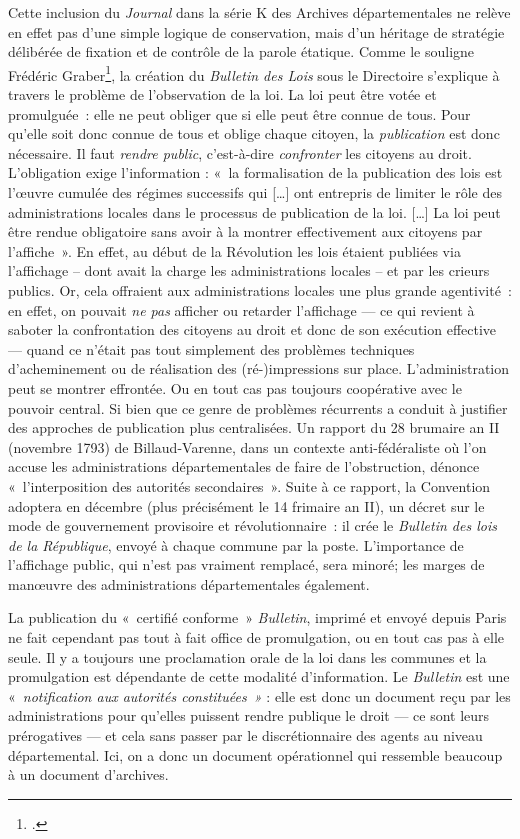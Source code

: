 Cette inclusion du \emph{Journal} dans la série K des Archives départementales ne relève en effet pas d’une simple logique de conservation, mais d’un héritage de stratégie délibérée de fixation et de contrôle de la parole étatique. Comme le souligne Frédéric Graber\footcite[][]{graber}, la création du \emph{Bulletin des Lois} sous le Directoire s'explique à travers le problème de l'observation de la loi. La loi peut être votée et promulguée : elle ne peut obliger que si elle peut être connue de tous. Pour qu’elle soit donc connue de tous et oblige chaque citoyen, la \emph{publication} est donc nécessaire. Il faut \emph{rendre public}, c’est-à-dire \emph{confronter} les citoyens au droit. L’obligation exige l’information : « la formalisation de la publication des lois est l’œuvre cumulée des régimes successifs qui […] ont entrepris de limiter le rôle des 
administrations locales dans le processus de publication de la loi. […] La loi peut être rendue obligatoire sans avoir à la montrer effectivement aux citoyens par l’affiche ». En effet, au début de la Révolution les lois étaient publiées via l’affichage -- dont avait la charge les administrations locales -- et par les crieurs publics. Or, cela  offraient aux administrations locales une plus grande agentivité : en  effet, on pouvait \emph{ne pas} afficher ou retarder l’affichage — ce  qui revient à saboter la confrontation des citoyens au droit et donc de son exécution effective — quand ce n’était pas tout simplement des problèmes techniques d’acheminement ou de réalisation des (ré-)impressions sur place. L’administration peut se montrer effrontée. Ou en tout cas pas  toujours coopérative avec le pouvoir central. Si bien que ce genre de problèmes récurrents a conduit à justifier des approches de publication plus centralisées. Un rapport du 28 brumaire an II (novembre 1793) de Billaud-Varenne, dans un contexte anti-fédéraliste où l’on accuse les administrations  départementales de faire de l’obstruction, dénonce « l’interposition des  autorités secondaires ». Suite à ce rapport, la Convention adoptera en décembre (plus précisément le 14 frimaire an II), un décret sur le mode de gouvernement provisoire et révolutionnaire : il crée le \emph{Bulletin des lois de la République}, envoyé à chaque commune par la poste. L’importance de l’affichage public, qui n’est pas vraiment remplacé, sera minoré; les marges de manœuvre des administrations départementales également.

La publication du « certifié conforme » \emph{Bulletin}, imprimé et envoyé depuis Paris ne fait cependant pas tout à fait office de promulgation, ou en tout cas pas à elle seule. Il y a toujours une proclamation orale de la loi dans les communes et la promulgation est dépendante de cette modalité d’information. Le \emph{Bulletin} est une « \emph{notification aux autorités constituées »} : elle est donc un document reçu par les administrations pour qu’elles puissent rendre publique le droit — ce sont leurs  prérogatives — et cela sans passer par le discrétionnaire des agents au  niveau départemental. Ici, on a donc un document opérationnel qui ressemble beaucoup à un document d’archives.

